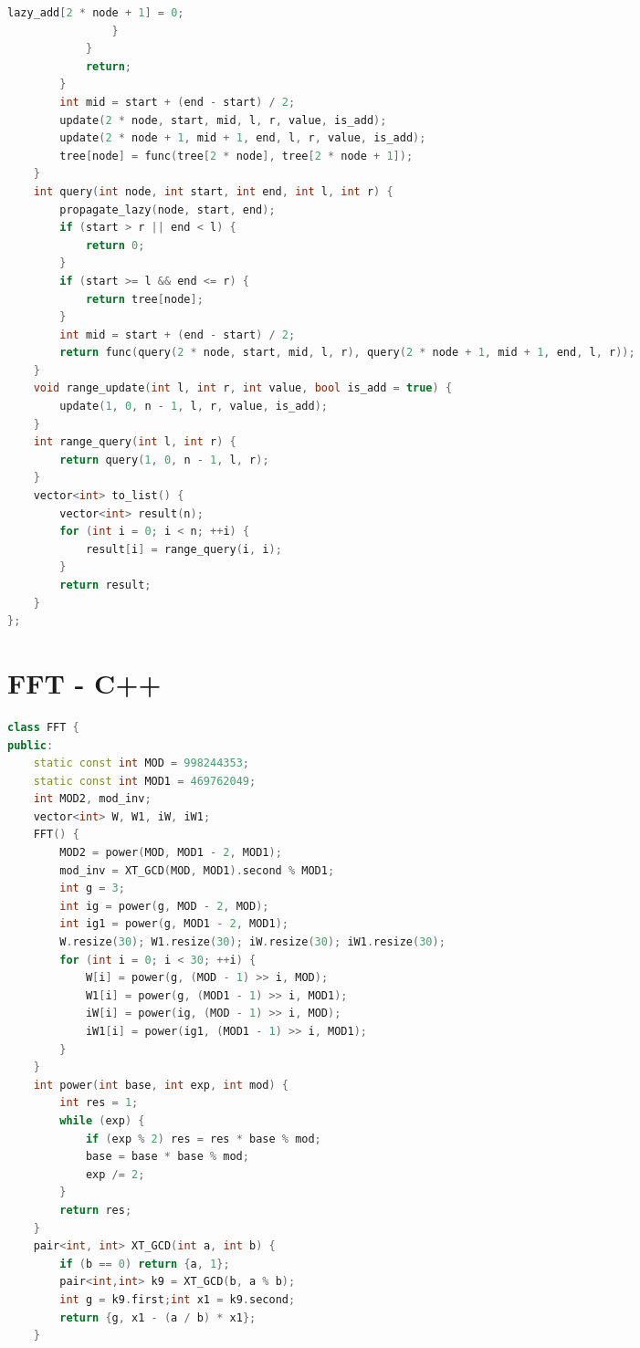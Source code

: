 \documentclass[10pt,landscape, a4paper]{article}
\begin{document}
\begin{multicols*}{3}
\begin{lstlisting}[language=C++]
                    lazy_add[2 * node + 1] = 0;
                }
            }
            return;
        }
        int mid = start + (end - start) / 2;
        update(2 * node, start, mid, l, r, value, is_add);
        update(2 * node + 1, mid + 1, end, l, r, value, is_add);
        tree[node] = func(tree[2 * node], tree[2 * node + 1]);
    }
    int query(int node, int start, int end, int l, int r) {
        propagate_lazy(node, start, end);
        if (start > r || end < l) {
            return 0;
        }
        if (start >= l && end <= r) {
            return tree[node];
        }
        int mid = start + (end - start) / 2;
        return func(query(2 * node, start, mid, l, r), query(2 * node + 1, mid + 1, end, l, r));
    }
    void range_update(int l, int r, int value, bool is_add = true) {
        update(1, 0, n - 1, l, r, value, is_add);
    }
    int range_query(int l, int r) {
        return query(1, 0, n - 1, l, r);
    }
    vector<int> to_list() {
        vector<int> result(n);
        for (int i = 0; i < n; ++i) {
            result[i] = range_query(i, i);
        }
        return result;
    }
};
\end{lstlisting}

\section{FFT - C++}
\begin{lstlisting}[language=C++]
class FFT {
public:
    static const int MOD = 998244353;
    static const int MOD1 = 469762049;
    int MOD2, mod_inv;
    vector<int> W, W1, iW, iW1;
    FFT() {
        MOD2 = power(MOD, MOD1 - 2, MOD1);
        mod_inv = XT_GCD(MOD, MOD1).second % MOD1;
        int g = 3;
        int ig = power(g, MOD - 2, MOD);
        int ig1 = power(g, MOD1 - 2, MOD1);
        W.resize(30); W1.resize(30); iW.resize(30); iW1.resize(30);
        for (int i = 0; i < 30; ++i) {
            W[i] = power(g, (MOD - 1) >> i, MOD);
            W1[i] = power(g, (MOD1 - 1) >> i, MOD1);
            iW[i] = power(ig, (MOD - 1) >> i, MOD);
            iW1[i] = power(ig1, (MOD1 - 1) >> i, MOD1);
        }
    }
    int power(int base, int exp, int mod) {
        int res = 1;
        while (exp) {
            if (exp % 2) res = res * base % mod;
            base = base * base % mod;
            exp /= 2;
        }
        return res;
    }
    pair<int, int> XT_GCD(int a, int b) {
        if (b == 0) return {a, 1};
        pair<int,int> k9 = XT_GCD(b, a % b);
        int g = k9.first;int x1 = k9.second;
        return {g, x1 - (a / b) * x1};
    }


\end{lstlisting}
\end{multicols*}
\end{document}
